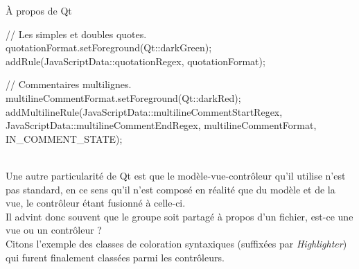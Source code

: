 \documentclass[a4paper, 12pt]{report}
\begin{document}
\begin{chapter}
\begin{section}{À propos de Qt}
\begin{center}
\begin{cppcode}
{    // Les simples et doubles quotes.
    quotationFormat.setForeground(Qt::darkGreen);
    addRule(JavaScriptData::quotationRegex, quotationFormat);

    // Commentaires multilignes.
    multilineCommentFormat.setForeground(Qt::darkRed);
    addMultilineRule(JavaScriptData::multilineCommentStartRegex,
                     JavaScriptData::multilineCommentEndRegex,
                     multilineCommentFormat,
                     IN_COMMENT_STATE);
}
			\end{cppcode}
			\end{center}~\\


			Une autre particularité de \gls{Qt} est que le modèle-vue-contrôleur qu'il utilise n'est pas standard, en ce sens qu'il n'est composé
			en réalité que du modèle et de la vue, le contrôleur étant fusionné à celle-ci.\\
			Il advint donc souvent que le groupe soit partagé à propos d'un fichier, est-ce une vue ou un contrôleur ?\\
			Citons l'exemple des classes de coloration syntaxiques (suffixées par \emph{Highlighter}) qui furent finalement classées parmi les
			contrôleurs.
	\end{section}
	\end{chapter}
	\renewcommand\glossaryname{Glossaire}
	\renewcommand{\glsnamefont}[1]{\makefirstuc{#1}} %
	\printglossaries
	\renewcommand\bibname{Sitographie}%
\end{document}
